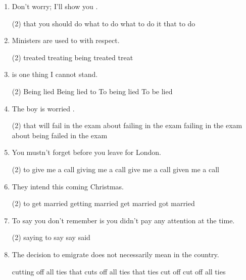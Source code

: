 \begin{enumerate}
\item Don't worry; I'll show you \ttu.
\begin{tasks}(2)
  \task that you should do
  \task what to do
  \task what to do it
  \task that to do
\end{tasks}

\item Ministers are used to \ttu with respect.
\begin{tasks}(2)
  \task treated
  \task treating
  \task being treated
  \task treat
\end{tasks}

\item \ttu is one thing I cannot stand.
\begin{tasks}(2)
  \task Being lied
  \task Being lied to
  \task To being lied
  \task To be lied
\end{tasks}

\item The boy is worried \ttu.
\begin{tasks}(2)
  \task that will fail in the exam
  \task about failing in the exam
  \task failing in the exam
  \task about being failed in the exam
\end{tasks}

\item You mustn't forget \ttu before you leave for London.
\begin{tasks}(2)
  \task to give me a call
  \task giving me a call
  \task give me a call
  \task given me a call
\end{tasks}

\item They intend \ttu this coming Christmas.
\begin{tasks}(2)
  \task to get married
  \task getting married
  \task get married
  \task got married
\end{tasks}

\item To say you don't remember is \ttu you didn't pay any attention at the
  time.
\begin{tasks}(2)
  \task saying
  \task to say
  \task say
  \task said
\end{tasks}

\item The decision to emigrate does not necessarily mean \ttu in the country.
\begin{tasks}
  \task cutting off all ties
  \task that cuts off all ties
  \task that ties cut off
  \task cut off all ties
\end{tasks}


\end{enumerate}
